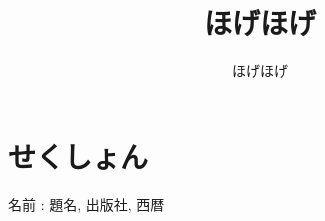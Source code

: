 \documentclass[10pt,a4j,twocolumn]{jarticle}
\title{ほげほげ}
\author{ほげほげ}
\date{\hfill}
\begin{document}
	\maketitle
	\thispagestyle{empty}
	\section{せくしょん}
	\begin{thebibliography}{9}
		 名前 : 題名, 出版社, 西暦
	\end{thebibliography}
\end{document}
